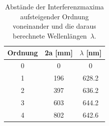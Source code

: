 \begin{table}
  \centering
  \caption{Abstände der Interferenzmaxima aufsteigender Ordnung voneinander und die daraus berechnete Wellenlängen~$\lambda$.}
  \begin{tabular}{ccc}
    \toprule
    {Ordnung}  & {2a [mm]} & {$\lambda$ [nm]} \\
		\midrule
	  \SI{0 }{} & \SI{  0}{} & \SI{  0}{} \\
    \SI{1 }{} & \SI{196}{} & \SI{628.2}{} \\
		\SI{2 }{} & \SI{397}{} & \SI{636.2}{} \\
		\SI{3 }{} & \SI{603}{} & \SI{644.2}{} \\
		\SI{4 }{} & \SI{802}{} & \SI{642.6}{} \\
    \bottomrule
	\end{tabular}
  \label{tab:wellenlaenge}
\end{table}
